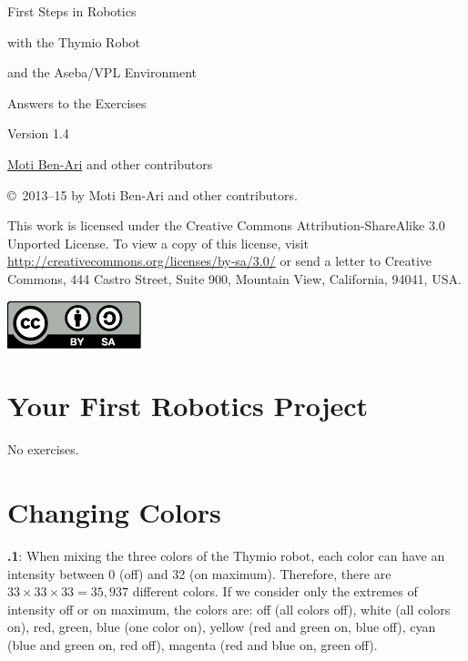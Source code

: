 \documentclass[11pt,a4paper,english]{article}
\begin{document}
\thispagestyle{empty}

\begin{center}
\begin{bfseries}

\begin{Large}
First Steps in Robotics

with the
Thymio Robot

and the
Aseba/VPL Environment

\bigskip

Answers to the Exercises

\end{Large}

Version 1.4

\bigskip

\href{http://www.weizmann.ac.il/sci-tea/benari/}{Moti Ben-Ari} and other contributors

\end{bfseries}
\end{center}

\bigskip

\copyright{}\  2013--15 by Moti Ben-Ari and other contributors.

This work is licensed under the Creative Commons
Attribution-ShareAlike 3.0 Unported License. To view a copy
of this license, visit
\url{http://creativecommons.org/licenses/by-sa/3.0/}
or send a letter to Creative Commons, 444 Castro Street, Suite 900,
Mountain View, California, 94041, USA.

\begin{center}
\hspace{6pt}\includegraphics[width=.2\textwidth]{../images/by-sa}
\end{center}

\section{Your First Robotics Project}

No exercises.

\section{Changing Colors}

\textbf{\thesection.1}: 
When mixing the three colors of the Thymio robot, each color can have
an intensity between 0 (off) and 32 (on maximum). Therefore, there are
$33 \times 33 \times 33=35,937$ different colors. If we consider only
the extremes of intensity off or on maximum, the colors are: off (all
colors off), white (all colors on), red, green, blue (one color on),
yellow (red and green on, blue off), cyan (blue and green on, red off),
magenta (red and blue on, green off).
\end{document}
